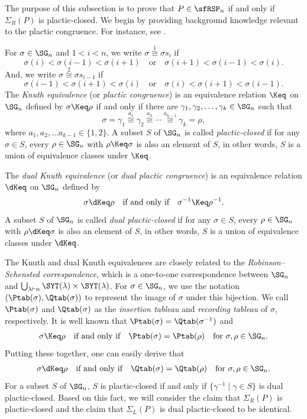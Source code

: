 \documentclass[12pt, reqno]{amsart}
\theoremstyle{definition}
\numberwithin{equation}{section} \numberwithin{figure}{section}
\numberwithin{table}{section}
\begin{document}
The purpose of this subsection is to  prove that $P \in \sfRSP_n$ if and only if $\Sigma_R(P)$ is plactic-closed.
We begin by providing  background knowledge relevant to the plactic congruence.
For instance, see \cite{05BB, 97Ful, 91Sag, 99Stanley}.


For $\sigma \in \SG_n$ and $1 < i < n$, 
we write $\sigma \overset{1}{\cong} \sigma s_i$ if
\[
\sigma(i) < \sigma(i-1) < \sigma(i+1) 
\quad \text{or} \quad 
\sigma(i+1) < \sigma(i-1) < \sigma(i).
\]
And, we write $\sigma \overset{2}{\cong} \sigma s_{i-1}$ if
\[
\sigma(i-1) < \sigma(i+1) < \sigma(i) 
\quad \text{or} \quad 
\sigma(i) < \sigma(i+1) < \sigma(i-1).
\]
The \emph{Knuth equivalence} (or \emph{plactic congruence}) is an equivalence relation $\Keq$ on $\SG_n$ defined by $\sigma \Keq \rho$ if and only if there are $\gamma_1,\gamma_2, \ldots, \gamma_k \in \SG_n$ such that
\[
\sigma = \gamma_1 \overset{a_1}{\cong} \gamma_2 \overset{a_2}{\cong} \cdots \overset{a_{k-1}}{\cong} \gamma_k = \rho,
\]
where $a_1,a_2,\ldots a_{k-1} \in \{1,2\}$.
A subset $S$ of $\SG_n$ is called \emph{plactic-closed} if for any $\sigma \in S$, every $\rho \in \SG_n$ with $\rho \Keq \sigma$ is also an element of $S$,
in other words, $S$ is a union of equivalence classes under $\Keq$.

The \emph{dual Knuth equivalence} (or \emph{dual plactic congruence}) is an equivalence relation $\dKeq$ on $\SG_n$ defined by 
\[
\sigma \dKeq \rho
\quad \text{if and only if} \quad \sigma^{-1} \Keq \rho^{-1}.
\]
A subset $S$ of $\SG_n$ is called \emph{dual plactic-closed} if for any $\sigma \in S$, every $\rho \in \SG_n$ with $\rho \dKeq \sigma$ is also an element of $S$,
in other words, $S$ is a union of equivalence classes under $\dKeq$.

The Knuth and dual Knuth equivalences are closely related to the \emph{Robinson–Schensted correspondence}, which is a one-to-one correspondence between $\SG_n$ and $\bigcup_{\lambda \vdash n} \SYT(\lambda) \times \SYT(\lambda)$.
For $\sigma \in \SG_n$,
we use the notation $(\Ptab(\sigma), \Qtab(\sigma))$ to represent the image of $\sigma$ under this bijection.
We call $\Ptab(\sigma)$ and $\Qtab(\sigma)$ as the \emph{insertion tableau} and \emph{recording tableau} of $\sigma$, respectively.
It is well known that $\Ptab(\sigma) = \Qtab(\sigma^{-1})$ 
and
\begin{align*}
\sigma \Keq \rho 
\quad \text{if and only if} \quad 
\Ptab(\sigma) = \Ptab(\rho)
\quad \text{for $\sigma, \rho \in \SG_n$}.
\end{align*}
Putting these together, one can easily derive that
\begin{align*}
\sigma \dKeq \rho 
\quad \text{if and only if} \quad 
\Qtab(\sigma) = \Qtab(\rho)
\quad \text{for $\sigma, \rho \in \SG_n$}.
\end{align*}
For a subset $S$ of $\SG_n$, $S$ is plactic-closed if and only if $\{\gamma^{-1} \mid \gamma \in S\}$ is dual plactic-closed.
Based on this fact, we will consider the claim that $\Sigma_R(P)$ is plactic-closed and the claim that $\Sigma_L(P)$ is dual plactic-closed to be identical.
\end{document}
